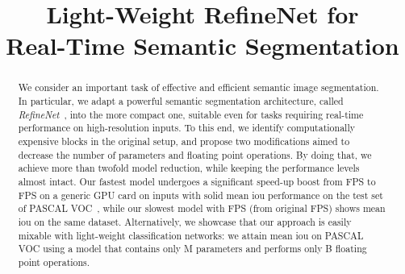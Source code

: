 \documentclass{bmvc2k}
\title{Light-Weight RefineNet for\\ Real-Time Semantic Segmentation}
\begin{document}
\makeatletter
{}
\makeatother

\renewcommand{\partname}{}

\maketitle
\vspace{-0.25in}
\begin{abstract}
We consider an important task of effective and efficient semantic image segmentation. In particular, we adapt a powerful semantic segmentation architecture, called \textit{RefineNet}~\cite{LinMSR17}, into the more compact one, suitable even for tasks requiring real-time performance on high-resolution inputs. To this end, we identify computationally expensive blocks in the original setup, and propose two modifications aimed to decrease the number of parameters and floating point operations. By doing that, we achieve more than twofold model reduction, while keeping the performance levels almost intact. Our fastest model undergoes a significant speed-up boost from  FPS to  FPS on a generic GPU card on  inputs with solid  mean iou performance on the test set of PASCAL VOC~\cite{EveringhamGWWZ10}, while our slowest model with  FPS (from original  FPS) shows  mean iou on the same dataset. Alternatively, we showcase that our approach is easily mixable with light-weight classification networks: we attain  mean iou on PASCAL VOC using a model that contains only M parameters and performs only B floating point operations.
\end{abstract}
\vspace{-0.25in}
\end{document}
